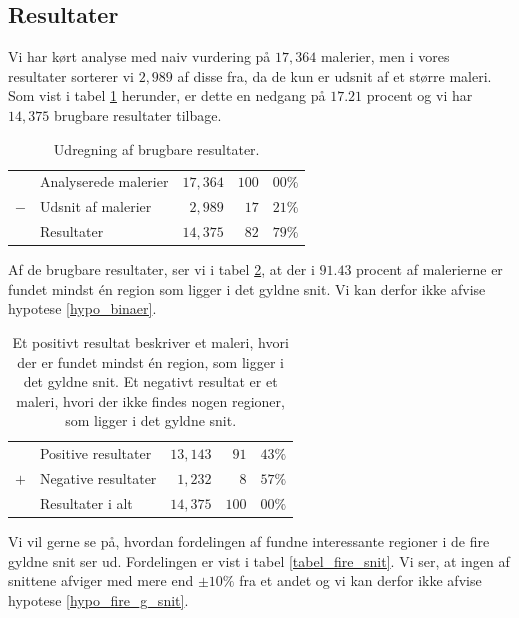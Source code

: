 {\clearpage

\subsection{Resultater}
Vi har kørt analyse med naiv vurdering på $17,364$ malerier, men i vores
resultater sorterer vi $2,989$ af disse fra, da de kun er udsnit af et
større maleri.  Som vist i tabel \ref{tabel_fjern_detaljer} herunder, er
dette en nedgang på $17.21$ procent og vi har $14,375$ brugbare
resultater tilbage.

\begin{table}[H]
    \centering
    \begin{tabular}{r@{\ \ }p{12em}r|r@{.}l}
            & Analyserede malerier & $17,364$ & $100$ & $00\%$   \\
        $-$ & Udsnit af malerier   &  $2,989$ &  $17$ & $21\%$   \\\hline
            & Resultater           & $14,375$ &  $82$ & $79\%$
    \end{tabular}
    \caption[]{Udregning af brugbare resultater.}
    \label{tabel_fjern_detaljer}
\end{table}

Af de brugbare resultater, ser vi i tabel \ref{tabel_fordeling}, at der
i $91.43$ procent af malerierne er fundet mindst én region som ligger i
det gyldne snit. Vi kan derfor ikke afvise hypotese \ref{hypo_binaer}.

\begin{table}[H]
    \centering
    \begin{tabular}{r@{\ \ }p{12em}r|r@{.}l}
            & Positive resultater   & $13,143$ &  $91$ & $43\%$ \\
        $+$ & Negative resultater   &  $1,232$ &   $8$ & $57\%$ \\\hline
            & Resultater i alt      & $14,375$ & $100$ & $00\%$
    \end{tabular}
    \caption[]{Et positivt resultat beskriver et maleri, hvori der er
    fundet mindst én region, som ligger i det gyldne snit. Et negativt
    resultat er et maleri, hvori der ikke findes nogen regioner, som
    ligger i det gyldne snit.}
    \label{tabel_fordeling}
\end{table}

Vi vil gerne se på, hvordan fordelingen af fundne interessante regioner i
de fire gyldne snit ser ud. Fordelingen er vist i tabel
\ref{tabel_fire_snit}. Vi ser, at ingen af snittene afviger med mere end
$\pm10\%$ fra et andet og vi kan derfor ikke afvise hypotese
\ref{hypo_fire_g_snit}.

}
